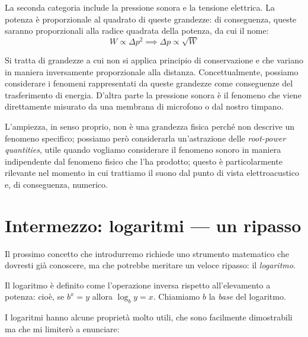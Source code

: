 La seconda categoria include la pressione sonora e la tensione elettrica. La potenza è proporzionale al quadrato di queste grandezze: di conseguenza, queste saranno proporzionali alla radice quadrata della potenza, da cui il nome:
\begin{equation}
W \propto \Delta p^2 \implies \Delta p \propto \sqrt{W}
\end{equation}

Si tratta di grandezze a cui non si applica principio di conservazione e che variano in maniera inversamente proporzionale alla distanza. Concettualmente, possiamo considerare i fenomeni rappresentati da queste grandezze come conseguenze del trasferimento di energia. D'altra parte la pressione sonora è il fenomeno che viene direttamente misurato da una membrana di microfono o dal nostro timpano.

L'ampiezza, in senso proprio, non è una grandezza fisica perché non descrive un fenomeno specifico; possiamo però considerarla un'astrazione delle \emph{root-power quantities}, utile quando vogliamo considerare il fenomeno sonoro in maniera indipendente dal fenomeno fisico che l'ha prodotto; questo è particolarmente rilevante nel momento in cui trattiamo il suono dal punto di vista elettroacustico e, di conseguenza, numerico.



\section{Intermezzo: logaritmi --- un ripasso}

Il prossimo concetto che introdurremo richiede uno strumento matematico che dovresti già conoscere, ma che potrebbe meritare un veloce ripasso: il \emph{logaritmo}.

Il logaritmo è definito come l'operazione inversa rispetto all'elevamento a potenza: cioè, se $b^x = y$ allora $\log _b y = x$. Chiamiamo $b$ la \emph{base} del logaritmo.

I logaritmi hanno alcune proprietà molto utili, che sono facilmente dimostrabili ma che mi limiterò a enunciare:

